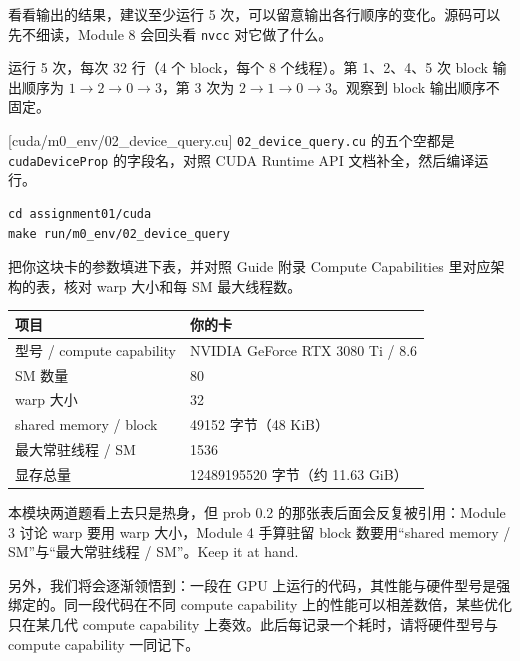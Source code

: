 \documentclass[11pt,a4paper,fontset=none]{ctexart}
\begin{document}
看看输出的结果，建议至少运行 5 次，可以留意输出各行顺序的变化。源码可以先不细读，Module 8 会回头看 \texttt{nvcc} 对它做了什么。

\begin{tcolorbox}[title={0.1 实验记录}]
运行 5 次，每次 32 行（4 个 block，每个 8 个线程）。第 1、2、4、5 次 block 输出顺序为 $1\to2\to0\to3$，第 3 次为 $2\to1\to0\to3$。观察到 block 输出顺序不固定。
\end{tcolorbox}

[cuda/m0\_env/02\_device\_query.cu]
\texttt{02\_device\_query.cu} 的五个空都是 \texttt{cudaDeviceProp} 的字段名，对照 CUDA Runtime API 文档补全，然后编译运行。

\begin{lstlisting}
cd assignment01/cuda
make run/m0_env/02_device_query
\end{lstlisting}

把你这块卡的参数填进下表，并对照 Guide 附录 Compute Capabilities 里对应架构的表，核对 warp 大小和每 SM 最大线程数。

\begin{center}\small
\begin{tabular}{@{}ll@{}}
\toprule
项目 & 你的卡 \\
\midrule
型号 / compute capability & NVIDIA GeForce RTX 3080 Ti / 8.6 \\
SM 数量 & 80 \\
warp 大小 & 32 \\
shared memory / block & 49152 字节（48 KiB） \\
最大常驻线程 / SM & 1536 \\
显存总量 & 12489195520 字节（约 11.63 GiB） \\
\bottomrule
\end{tabular}
\end{center}

\begin{lookback}
本模块两道题看上去只是热身，但 prob 0.2 的那张表后面会反复被引用：Module 3 讨论 warp 要用 warp 大小，Module 4 手算驻留 block 数要用“shared memory / SM”与“最大常驻线程 / SM”。Keep it at hand.

另外，我们将会逐渐领悟到：一段在 GPU 上运行的代码，其性能与硬件型号是强绑定的。同一段代码在不同 compute capability 上的性能可以相差数倍，某些优化只在某几代 compute capability 上奏效。此后每记录一个耗时，请将硬件型号与 compute capability 一同记下。
\end{lookback}

\end{document}

